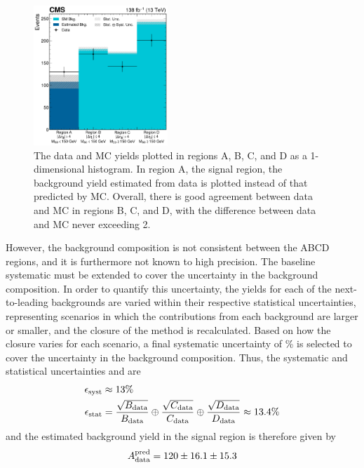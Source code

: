 \begin{figure}[htb]
    \centering
    \includegraphics[width=0.45\textwidth]{fig/vbswh/regionsABCD_closure_unblinded.pdf}
    \caption{
        The data and MC yields plotted in regions A, B, C, and D as a 1-dimensional histogram. 
        In region A, the signal region, the background yield estimated from data is plotted instead of that predicted by MC. 
        Overall, there is good agreement between data and MC in regions B, C, and D, with the difference between data and MC never exceeding 2\std. 
    }
    \label{fig:vbswh_abcd_closure}
\end{figure}
However, the background composition is not consistent between the ABCD regions, and it is furthermore not known to high precision. 
The baseline systematic must be extended to cover the uncertainty in the background composition. 
In order to quantify this uncertainty, the yields for each of the next-to-leading backgrounds are varied within their respective statistical uncertainties, representing scenarios in which the contributions from each background are larger or smaller, and the closure of the method is recalculated. 
Based on how the closure varies for each scenario, a final systematic uncertainty of \BkgEstTotalSystErr\% is selected to cover the uncertainty in the background composition. 
Thus, the systematic and statistical uncertainties \Esyst and \Estat are
\begin{align*}
    \epsilon_{\text{syst}} &\approx 13\% \\
    \epsilon_{\text{stat}} &= \frac{\sqrt{B_{\text{data}}}}{B_{\text{data}}} \oplus \frac{\sqrt{C_{\text{data}}}}{C_{\text{data}}} \oplus \frac{\sqrt{D_{\text{data}}}}{D_{\text{data}}} \approx 13.4\%
\end{align*}
and the estimated background yield in the signal region is therefore given by 
\begin{equation*}
    A_{\text{data}}^\text{pred} = 120 \pm 16.1 \pm 15.3
\end{equation*}
